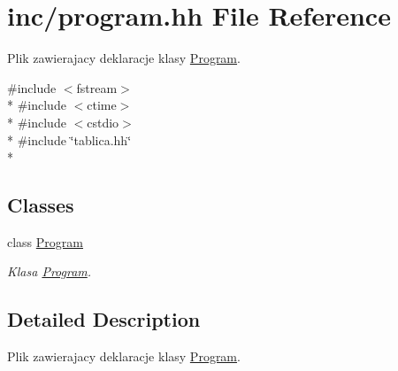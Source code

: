 \hypertarget{program_8hh}{\section{inc/program.hh File Reference}
\label{program_8hh}
}


Plik zawierajacy deklaracje klasy \hyperlink{class_program}{Program}.  


{\ttfamily \#include $<$fstream$>$}\\*
{\ttfamily \#include $<$ctime$>$}\\*
{\ttfamily \#include $<$cstdio$>$}\\*
{\ttfamily \#include \char`\"{}tablica.\+hh\char`\"{}}\\*
\subsection*{Classes}
\begin{DoxyCompactItemize}
\item 
class \hyperlink{class_program}{Program}
\begin{DoxyCompactList}\small\item\em Klasa \hyperlink{class_program}{Program}. \end{DoxyCompactList}\end{DoxyCompactItemize}


\subsection{Detailed Description}
Plik zawierajacy deklaracje klasy \hyperlink{class_program}{Program}. 

